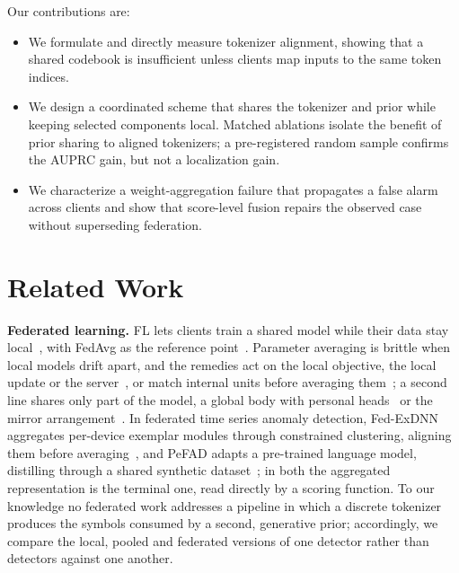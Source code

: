 \documentclass[conference]{IEEEtran}
\begin{document}
Our contributions are:
\begin{itemize}
    \setlength{\topsep}{2pt}
    \setlength{\partopsep}{0pt}
    \setlength{\itemsep}{0pt}
    \setlength{\parskip}{0pt}
    \setlength{\parsep}{0pt}
    \item We formulate and directly measure tokenizer alignment, showing that a shared codebook is
    insufficient unless clients map inputs to the same token indices.
    \item We design a coordinated scheme that shares the tokenizer and prior while keeping selected
    components local. Matched ablations isolate the benefit of prior sharing to aligned tokenizers;
    a pre-registered random sample confirms the AUPRC gain, but not a localization gain.
    \item We characterize a weight-aggregation failure that propagates a false alarm across clients
    and show that score-level fusion repairs the observed case without superseding federation.
\end{itemize}

\section{Related Work}

\textbf{Federated learning.} FL lets clients train a shared model while their data stay
local~\cite{kairouz2021advances}, with FedAvg as the reference point~\cite{mcmahan2017federated}.
Parameter averaging is brittle when local models drift apart, and the remedies act on the local
objective, the local update or the
server~\cite{li2020fedprox,karimireddy2020scaffold,reddi2021adaptive}, or match internal units
before averaging them~\cite{wang2020fedma}; a second line shares only part of the model, a global
body with personal heads~\cite{arivazhagan2019fedper} or the mirror
arrangement~\cite{liang2020lgfedavg}. In federated time series anomaly
detection, Fed-ExDNN aggregates per-device exemplar modules through constrained clustering, aligning
them before averaging~\cite{zhu2022fedexdnn}, and PeFAD adapts a pre-trained language model,
distilling through a shared synthetic dataset~\cite{xu2024pefad}; in both the aggregated
representation is the terminal one, read directly by a scoring function. To our knowledge no
federated work addresses a pipeline in which a discrete tokenizer produces the symbols consumed by
a second, generative prior; accordingly, we compare the local, pooled and federated versions of
one detector rather than detectors against one another.
\end{document}
